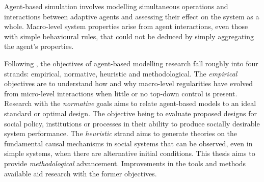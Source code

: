 Agent-based simulation involves modelling simultaneous operations and
interactions between adaptive agents and assessing their effect on the system
as a whole.  Macro-level system properties arise from agent interactions, even
those with simple behavioural rules, that could not be deduced by simply
aggregating the agent's properties. %

Following , the objectives of agent-based modelling
research fall roughly into four strands: empirical, normative, heuristic and
methodological. The \textit{empirical} objectives are to understand how and why macro-level
regularities have evolved from micro-level interactions when little or no
top-down control is present.  Research with the \textit{normative} goals aims
to relate agent-based models to an ideal standard or optimal design.  The objective being
to evaluate proposed designs for social policy, institutions or processes in
their ability to produce socially desirable system performance.  The
\textit{heuristic} strand aims to generate theories on the fundamental causal
mechanisms in social systems that can be observed, even in simple systems, when there are
alternative initial conditions.  This thesis aims to provide
\textit{methodological} advancement.  Improvements in the tools and methods
available aid research with the former objectives.

